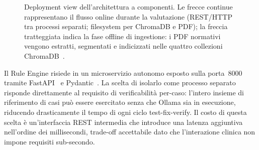 \begin{figure}[ht]
{%
}
\caption{Deployment view dell'architettura a componenti. Le frecce continue
  rappresentano il flusso online durante la valutazione (REST/HTTP tra processi
  separati; filesystem per ChromaDB e PDF); la freccia tratteggiata indica
  la fase offline di ingestione: i PDF normativi vengono estratti, segmentati
  e indicizzati nelle quattro collezioni ChromaDB~\cite{chromadb}.}
\label{fig:architettura}
\end{figure}

Il Rule Engine risiede in un microservizio autonomo esposto sulla porta~8000
tramite FastAPI~\cite{fastapi} e Pydantic~\cite{pydantic}.
La scelta di isolarlo come processo separato risponde direttamente al requisito
di verificabilità per-caso: l'intero insieme di riferimento di \goldn{} casi
può essere esercitato senza che Ollama sia in esecuzione, riducendo
drasticamente il tempo di ogni ciclo test-fix-verify.
Il costo di questa scelta è un'interfaccia REST intermedia che introduce
una latenza aggiuntiva nell'ordine dei millisecondi, trade-off accettabile
dato che l'interazione clinica non impone requisiti sub-secondo.

